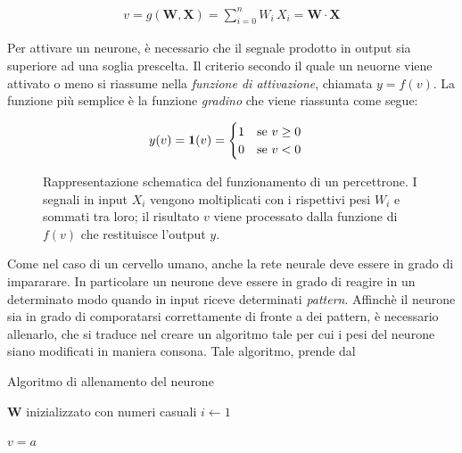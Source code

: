 \begin{gather*}
    v = g\left(\mathbf{W}, \mathbf{X}\right) = \sum_{i = 0}^n W_i\,X_i = \mathbf{W}\cdot\mathbf{X}
\end{gather*}

\noindent Per attivare un neurone, è necessario che il segnale prodotto in output sia superiore ad una soglia prescelta. Il criterio secondo il quale un neuorne viene attivato o meno si riassume nella \textsl{funzione di attivazione}, chiamata $y = f(v)$. La funzione più semplice è la funzione \textsl{gradino} che viene riassunta come segue:

\begin{gather*}
    y(v) = \text{\textbf{1}}(v) =
    \begin{cases}
        1 \hspace{10px} \text{se } v\geq0\\
        0 \hspace{10px} \text{se } v<0
    \end{cases}
\end{gather*}

\begin{figure}[!b]
    \centering
    
    \caption[Rappresentazione schematica del funzionamento di un percettrone.]{Rappresentazione schematica del funzionamento di un percettrone. I segnali in input $X_i$ vengono moltiplicati con i rispettivi pesi $W_i$ e sommati tra loro; il risultato $v$ viene processato dalla funzione di $f(v)$ che restituisce l'output $y$.}\label{fig:perceptron}
\end{figure}

\noindent Come nel caso di un cervello umano, anche la rete neurale deve essere in grado di impararare. In particolare un neurone deve essere in grado di reagire in un determinato modo quando in input riceve determinati \textsl{pattern}. Affinchè il neurone sia in grado di comporatarsi correttamente di fronte a dei pattern, è necessario allenarlo, che si traduce nel creare un algoritmo tale per cui i pesi del neurone siano modificati in maniera consona. Tale algoritmo, prende dal 

\begin{algorithm}[ht]
    \caption{Algoritmo di allenamento del neurone}\label{alg:PLA}
    \begin{algorithmic}
        \STATE$\mathbf{W}$ inizializzato con numeri casuali
        \STATE$i \gets 1$
        
            \STATE$v = a$
        \ENDWHILE\,
    \end{algorithmic}
\end{algorithm}

